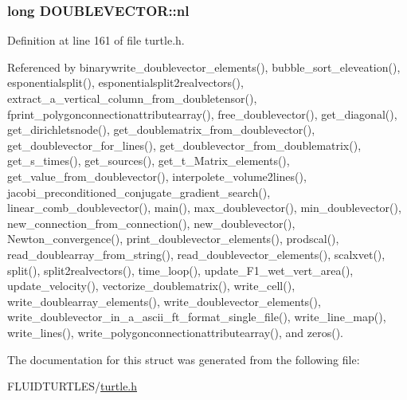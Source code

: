 \hypertarget{struct_d_o_u_b_l_e_v_e_c_t_o_r_adcb6f52f9d62535f5aaaca09579ea005}{
\subsubsection[{nl}]{\setlength{\rightskip}{0pt plus 5cm}long D\-O\-U\-B\-L\-E\-V\-E\-C\-T\-O\-R\-::nl}}\label{struct_d_o_u_b_l_e_v_e_c_t_o_r_adcb6f52f9d62535f5aaaca09579ea005}


Definition at line 161 of file turtle.\-h.



Referenced by binarywrite\-\_\-doublevector\-\_\-elements(), bubble\-\_\-sort\-\_\-eleveation(), esponentialsplit(), esponentialsplit2realvectors(), extract\-\_\-a\-\_\-vertical\-\_\-column\-\_\-from\-\_\-doubletensor(), fprint\-\_\-polygonconnectionattributearray(), free\-\_\-doublevector(), get\-\_\-diagonal(), get\-\_\-dirichletsnode(), get\-\_\-doublematrix\-\_\-from\-\_\-doublevector(), get\-\_\-doublevector\-\_\-for\-\_\-lines(), get\-\_\-doublevector\-\_\-from\-\_\-doublematrix(), get\-\_\-s\-\_\-times(), get\-\_\-sources(), get\-\_\-t\-\_\-\-Matrix\-\_\-elements(), get\-\_\-value\-\_\-from\-\_\-doublevector(), interpolete\-\_\-volume2lines(), jacobi\-\_\-preconditioned\-\_\-conjugate\-\_\-gradient\-\_\-search(), linear\-\_\-comb\-\_\-doublevector(), main(), max\-\_\-doublevector(), min\-\_\-doublevector(), new\-\_\-connection\-\_\-from\-\_\-connection(), new\-\_\-doublevector(), Newton\-\_\-convergence(), print\-\_\-doublevector\-\_\-elements(), prodscal(), read\-\_\-doublearray\-\_\-from\-\_\-string(), read\-\_\-doublevector\-\_\-elements(), scalxvet(), split(), split2realvectors(), time\-\_\-loop(), update\-\_\-\-F1\-\_\-wet\-\_\-vert\-\_\-area(), update\-\_\-velocity(), vectorize\-\_\-doublematrix(), write\-\_\-cell(), write\-\_\-doublearray\-\_\-elements(), write\-\_\-doublevector\-\_\-elements(), write\-\_\-doublevector\-\_\-in\-\_\-a\-\_\-ascii\-\_\-ft\-\_\-format\-\_\-single\-\_\-file(), write\-\_\-line\-\_\-map(), write\-\_\-lines(), write\-\_\-polygonconnectionattributearray(), and zeros().



The documentation for this struct was generated from the following file\-:\begin{DoxyCompactItemize}
\item 
F\-L\-U\-I\-D\-T\-U\-R\-T\-L\-E\-S/\hyperlink{turtle_8h}{turtle.\-h}\end{DoxyCompactItemize}
